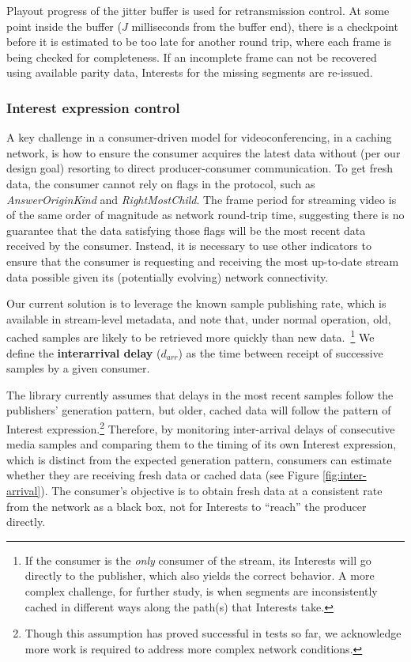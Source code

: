\documentclass{icn/sig-alternate-2013} %
\begin{document}
Playout progress of the jitter buffer is used for retransmission control. %
At some point inside the buffer ($J$ milliseconds from the buffer end), there is a checkpoint before it is estimated to be too late for another round trip, where each frame is being checked for completeness. If an incomplete frame can not be recovered using available parity data, Interests for the missing segments are re-issued. 

\subsubsection{Interest expression control}


A key challenge in a consumer-driven model for videoconferencing, in a caching network, is how to ensure the consumer acquires the latest data without (per our design goal) resorting to direct producer-consumer communication.
To get fresh data, the consumer cannot rely on flags in the protocol, such as \textit{AnswerOriginKind} and \textit{RightMostChild}. The frame period for streaming video is of the same order of magnitude as network round-trip time, suggesting there is no guarantee that the data satisfying those flags will be the most recent data received by the consumer. Instead, it is necessary to use other indicators to ensure that the consumer is requesting and receiving the most up-to-date stream data possible given its (potentially evolving) network connectivity. 

Our current solution is to leverage the known sample publishing rate, which is available in stream-level metadata, and note that, under normal operation, old, cached samples are likely to be retrieved more quickly than new data.~\footnote{If the consumer is the \emph{only} consumer of the stream, its Interests will go directly to the publisher, which also yields the correct behavior. A more complex challenge, for further study, is when segments are inconsistently cached in different ways along the path(s) that Interests take.} We define the \textbf{interarrival delay} ($d_{arr}$) as the time between receipt of successive samples by a given consumer. 

The library currently assumes that delays in the most recent samples follow the publishers' generation pattern, but older, cached data will follow the pattern of Interest expression.\footnote{Though this assumption has proved successful in tests so far, we acknowledge more work is required to address more complex network conditions.} Therefore, by monitoring inter-arrival delays of consecutive media samples and comparing them to the timing of its own Interest expression, which is distinct from the expected generation pattern, consumers can estimate whether they are receiving fresh data or cached data (see Figure \ref{fig:inter-arrival}). The consumer's objective is to obtain fresh data at a consistent rate from the network as a black box, not for Interests to ``reach'' the producer directly.  
\end{document}

